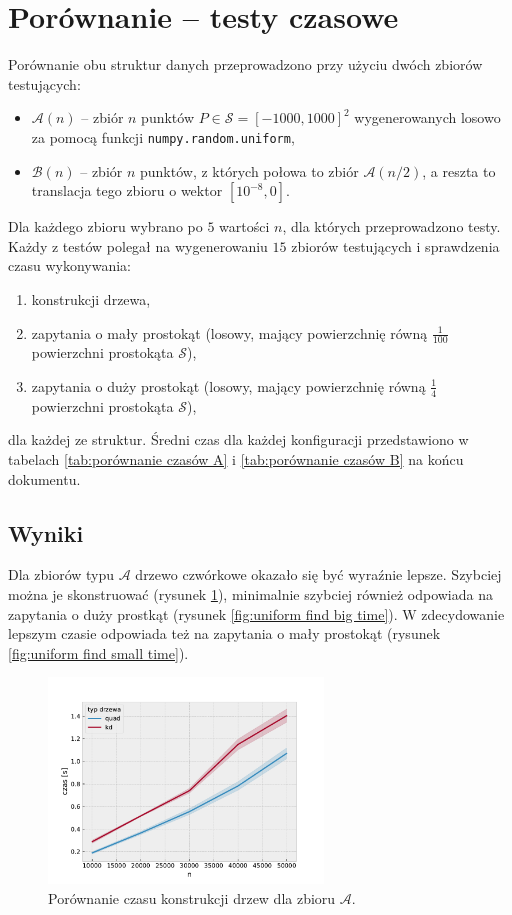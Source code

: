 \documentclass[12pt]{scrartcl}
\newcommand{\sA}{\mathcal A}
\newcommand{\sB}{\mathcal B}
\newcommand{\sS}{\mathcal S}
\begin{document}
\section{Porównanie -- testy czasowe}
Porównanie obu struktur danych przeprowadzono przy użyciu dwóch zbiorów testujących:
\begin{itemize}
    \item $\sA(n)$ -- zbiór $n$ punktów $P \in \sS = [-1000, 1000]^2$ wygenerowanych losowo za pomocą funkcji \texttt{numpy.random.uniform},
    \item $\sB(n)$ -- zbiór $n$ punktów, z których połowa to zbiór $\sA(n/2)$, a reszta to translacja tego zbioru o wektor $[10^{-8}, 0]$.
\end{itemize}

Dla każdego zbioru wybrano po $5$ wartości $n$, dla których przeprowadzono testy. Każdy z testów polegał na wygenerowaniu $15$ zbiorów testujących i sprawdzenia czasu wykonywania:
\begin{enumerate}
    \item konstrukcji drzewa,
    \item zapytania o mały prostokąt (losowy, mający powierzchnię równą $\frac{1}{100}$ powierzchni prostokąta $\sS$),
    \item zapytania o duży prostokąt (losowy, mający powierzchnię równą $\frac{1}{4}$ powierzchni prostokąta $\sS$),
\end{enumerate}
dla każdej ze struktur. Średni czas dla każdej konfiguracji przedstawiono w tabelach \ref{tab:porównanie czasów A} i \ref{tab:porównanie czasów B} na końcu dokumentu.

\subsection{Wyniki}

Dla zbiorów typu $\sA$ drzewo czwórkowe okazało się być wyraźnie lepsze. Szybciej można je skonstruować (rysunek \ref{fig:uniform construction time}), minimalnie szybciej również odpowiada na zapytania o duży prostkąt (rysunek \ref{fig:uniform find big time}). W zdecydowanie lepszym czasie odpowiada też na zapytania o mały prostokąt (rysunek \ref{fig:uniform find small time}).

\begin{figure}[H]
    \centering
    \includegraphics[width=0.65\textwidth]{imgs/uniform_construction_time}
    \caption{Porównanie czasu konstrukcji drzew dla zbioru $\sA$.}
    \label{fig:uniform construction time}
\end{figure}
\end{document}
